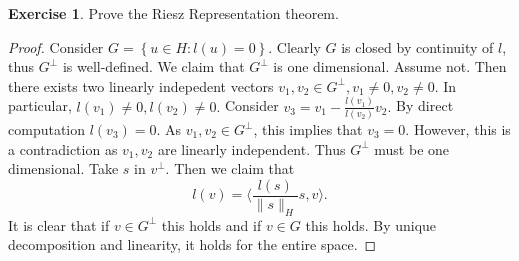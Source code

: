 \documentclass{amsart}
\theoremstyle{plain}
\theoremstyle{definition}
\newtheorem{exer}{Exercise}[section]
\begin{document}
\begin{exer}
    Prove the Riesz Representation theorem. 
\end{exer}
\begin{proof}
Consider $G = \left\{u\in H: l(u) = 0\right\}$. Clearly $G$ is closed by continuity of $l$, thus $G^{\perp}$ is well-defined. We claim that $G^{\perp}$ is one dimensional. Assume not. Then there exists two linearly indepedent vectors $v_1,v_2 \in G^{\perp}, v_1\neq 0, v_2 \neq 0.$ In particular, $l(v_1) \neq 0, l(v_2) \neq 0.$ Consider $v_3 = v_1 - \frac{l(v_1)}{l(v_2)}v_2.$  By direct computation $l(v_3) = 0.$ As $v_1,v_2 \in G^{\perp}$, this implies that $v_3 = 0.$ However, this is a contradiction as $v_1,v_2$ are linearly independent. Thus $G^{\perp}$ must be one dimensional. Take $s$ in $v^{\perp}$. Then we claim that 
$$l(v) = \langle \frac{l(s)}{\|s\|_{H}}s,v\rangle.$$
It is clear that if $v\in G^{\perp}$ this holds and if $v\in G$ this holds. By unique decomposition and linearity, it holds for the entire space. 
\end{proof}
\end{document}
